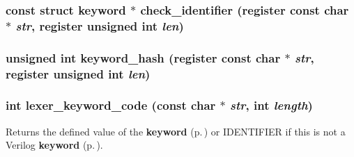 \subsubsection{\setlength{\rightskip}{0pt plus 5cm}const struct {\bf keyword} $\ast$ check\_\-identifier (register const char $\ast$ {\em str}, register unsigned int {\em len})}\label{keywords_8c_a6}


\subsubsection{\setlength{\rightskip}{0pt plus 5cm}unsigned int keyword\_\-hash (register const char $\ast$ {\em str}, register unsigned int {\em len})\hspace{0.3cm}{\tt  [static]}}\label{keywords_8c_a5}


\subsubsection{\setlength{\rightskip}{0pt plus 5cm}int lexer\_\-keyword\_\-code (const char $\ast$ {\em str}, int {\em length})}\label{keywords_8c_a7}


Returns the defined value of the {\bf keyword} {\rm (p.\,\pageref{structkeyword})} or IDENTIFIER if this is not a Verilog {\bf keyword} {\rm (p.\,\pageref{structkeyword})}.

